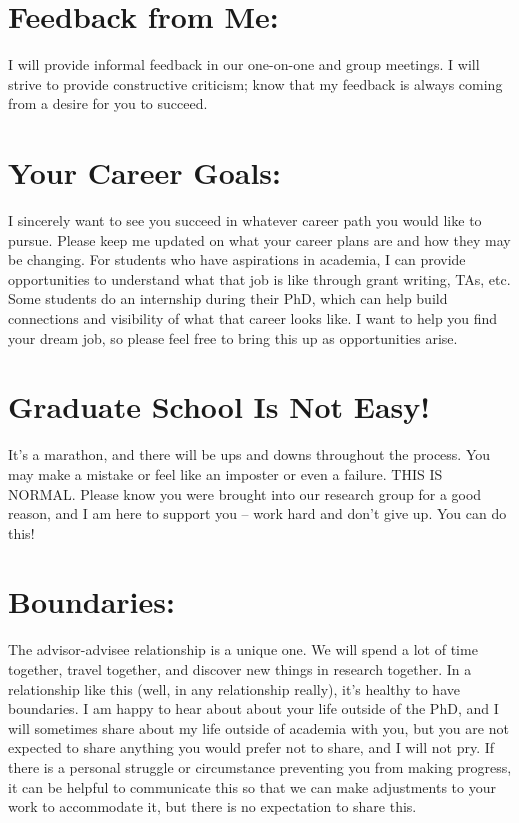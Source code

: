 \documentclass[11pt,letterpaper]{article}
\begin{document}
\section{Feedback from Me:} I will provide informal feedback in our one-on-one and group meetings. I will strive to provide constructive criticism; know that my feedback is always coming from a desire for you to succeed.

\section{Your Career Goals:} I sincerely want to see you succeed in whatever career path you would like to pursue. Please keep me updated on what your career plans are and how they may be changing. For students who have aspirations in academia, I can provide opportunities to understand what that job is like through grant writing, TAs, etc. Some students do an internship during their PhD, which can help build connections and visibility of what that career looks like. I want to help you find your dream job, so please feel free to bring this up as opportunities arise.


\section{Graduate School Is Not Easy!} It's a marathon, and there will be ups and downs throughout the process. You may make a mistake or feel like an imposter or even a failure. THIS IS NORMAL. Please know you were brought into our research group for a good reason, and I am here to support you -- work hard and don't give up. You can do this!

\section{Boundaries:} The advisor-advisee relationship is a unique one. We will spend a lot of time together, travel together, and discover new things in research together. In a relationship like this (well, in any relationship really), it's healthy to have boundaries. I am happy to hear about about your life outside of the PhD, and I will sometimes share about my life outside of academia with you, but you are not expected to share anything you would prefer not to share, and I will not pry. If there is a personal struggle or circumstance preventing you from making progress, it can be helpful to communicate this so that we can make adjustments to your work to accommodate it, but there is no expectation to share this.
\end{document}
